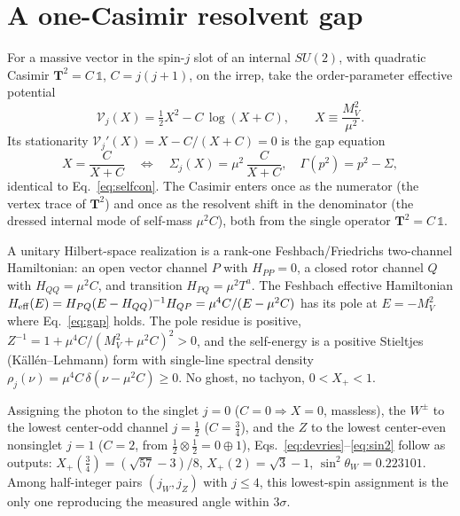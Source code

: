 \documentclass[11pt,aps,prd,nofootinbib]{revtex4-2}
\begin{document}
\section{A one-Casimir resolvent gap}
For a massive vector in the spin-$j$ slot of an internal $SU(2)$, with quadratic
Casimir $\mathbf{T}^2 = C\,\mathbb{1}$, $C=j(j+1)$, on the irrep, take the
order-parameter effective potential
\begin{equation}
  \mathcal V_j(X) = \tfrac12 X^2 - C\,\log(X+C),
  \qquad X \equiv \frac{M_V^2}{\mu^2}.
  \label{eq:Vpot}
\end{equation}
Its stationarity $\mathcal V_j'(X)=X-C/(X+C)=0$ is the gap equation
\begin{equation}
  X = \frac{C}{X+C} \quad\Longleftrightarrow\quad \Sigma_j(X)=\mu^2\,\frac{C}{X+C},
  \quad \Gamma(p^2)=p^2-\Sigma,
  \label{eq:gap}
\end{equation}
identical to Eq.~\eqref{eq:selfcon}. The Casimir enters once as the numerator
(the vertex trace of $\mathbf{T}^2$) and once as the resolvent shift in the
denominator (the dressed internal mode of self-mass $\mu^2 C$), both from the
single operator $\mathbf{T}^2=C\,\mathbb 1$.

A unitary Hilbert-space realization is a rank-one Feshbach/Friedrichs
two-channel Hamiltonian: an open vector channel $P$ with $H_{PP}=0$, a closed
rotor channel $Q$ with $H_{QQ}=\mu^2 C$, and transition $H_{PQ}=\mu^2 T^a$. The
Feshbach effective Hamiltonian $H_{\rm eff}(E)=H_{PQ}(E-H_{QQ})^{-1}H_{QP}
=\mu^4 C/(E-\mu^2 C)$ has its pole at $E=-M_V^2$ where Eq.~\eqref{eq:gap} holds.
The pole residue is positive, $Z^{-1}=1+\mu^4 C/(M_V^2+\mu^2 C)^2>0$, and the
self-energy is a positive Stieltjes (K\"all\'en--Lehmann) form with single-line
spectral density $\rho_j(\nu)=\mu^4 C\,\delta(\nu-\mu^2 C)\ge0$. No ghost, no
tachyon, $0<X_+<1$.

Assigning the photon to the singlet $j=0$ ($C=0\Rightarrow X=0$, massless), the
$W^\pm$ to the lowest center-odd channel $j=\tfrac12$ ($C=\tfrac34$), and the $Z$
to the lowest center-even nonsinglet $j=1$ ($C=2$, from $\tfrac12\otimes\tfrac12
=0\oplus1$), Eqs.~\eqref{eq:devries}--\eqref{eq:sin2} follow as outputs:
$X_+(\tfrac34)=(\sqrt{57}-3)/8$, $X_+(2)=\sqrt3-1$, $\sin^2\theta_W=0.223101$.
Among half-integer pairs $(j_W,j_Z)$ with $j\le4$, this lowest-spin assignment is
the only one reproducing the measured angle within $3\sigma$.
\end{document}

